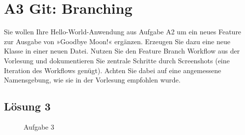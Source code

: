 \documentclass[main.tex]{subfiles}
\begin{document}
\section{A3 Git: Branching}
Sie wollen Ihre Hello-World-Anwendung aus Aufgabe A2 um ein neues Feature zur Ausgabe von
»Goodbye Moon!« ergänzen. Erzeugen Sie dazu eine neue Klasse in einer neuen Datei. Nutzen
Sie den Feature Branch Workflow aus der Vorlesung und dokumentieren Sie zentrale Schritte
durch Screenshots (eine Iteration des Workflows genügt). Achten Sie dabei auf eine angemessene
Namensgebung, wie sie in der Vorlesung empfohlen wurde.

\subsection{Lösung 3}
\begin{figure}[H]
    \caption{Aufgabe 3}
    \label{fig:a1}
\end{figure}
\end{document}
